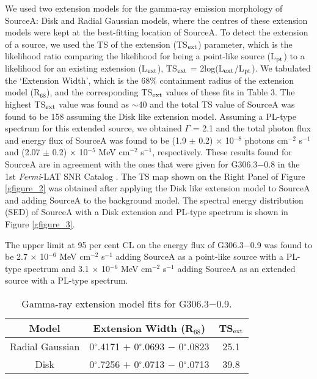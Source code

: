 \documentclass[useAMS,usenatbib]{mn2e}
\begin{document}
We used two extension models for the gamma-ray emission morphology of SourceA: Disk and Radial Gaussian models, where the centres of these extension models were kept at the best-fitting location of SourceA. To detect the extension of a source, we used the TS of the extension (TS$_{\rm ext}$) parameter, which is the likelihood ratio comparing the likelihood for being a point-like source (L$_{\rm pt}$) to a likelihood for an existing extension (L$_{\rm ext}$), TS$_{\rm ext}$ = 2log(L$_{\rm ext}$/L$_{\rm pt}$). We tabulated the `Extension Width', which is the 68\% containment radius of the extension model (R$_{68}$), and the corresponding TS$_{\rm ext}$ values of these fits in Table 3. The highest TS$_{\rm ext}$ value was found as $\sim$40 and the total TS value of SourceA was found to be 158 assuming the Disk like extension model. Assuming a PL-type spectrum for this extended source, we obtained $\Gamma$ = 2.1 and the total photon flux and energy flux of SourceA was found to be (1.9 $\pm$ 0.2) $\times$ 10$^{-8}$ photons cm$^{-2}$ s$^{-1}$ and (2.07 $\pm$ 0.2) $\times$ 10$^{-5}$ MeV cm$^{-2}$ s$^{-1}$, respectively. These results found for SourceA are in agreement with the ones that were given for G306.3$-$0.8 in the 1st {\it Fermi}-LAT SNR Catalog \citep{Ac16}. The TS map shown on the Right Panel of Figure \ref{gfigure_2} was obtained after applying the Disk like extension model to SourceA and adding SourceA to the background model. The spectral energy distribution (SED) of SourceA with a Disk extension and PL-type spectrum is shown in Figure \ref{gfigure_3}.

The upper limit at 95 per cent CL on the energy flux of G306.3$-$0.9 was found to be 2.7 $\times$ 10$^{-6}$ MeV cm$^{-2}$ s$^{-1}$ adding SourceA as a point-like source with a PL-type spectrum and 3.1 $\times$ 10$^{-6}$ MeV cm$^{-2}$ s$^{-1}$ adding SourceA as an extended source with a PL-type spectrum. 

\begin{table}
 \begin{minipage}{90mm}
 \begin{center}
  \caption{Gamma-ray extension model fits for G306.3$-$0.9.}
 \begin{tabular}{@{}ccc@{}}
  \hline\hline
       Model & Extension Width (R$_{68}$)  & TS$_{\rm ext}$\\
\hline
Radial Gaussian & 0$^{\circ}\!\!$.4171 $+$ 0$^{\circ}\!\!$.0693 $-$ 0$^{\circ}\!\!$.0823 & 25.1 \\
Disk                    & 0$^{\circ}\!\!$.7256 $+$ 0$^{\circ}\!\!$.0713 $-$ 0$^{\circ}\!\!$.0713 & 39.8 \\
 \hline
\end{tabular}
\end{center}
\end{minipage}
\end{table}
\end{document}
